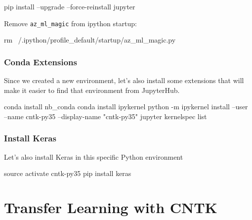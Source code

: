 \documentclass[]{book}
\newenvironment{Shaded}{\begin{snugshade}}{\end{snugshade}}
\newcommand{\StringTok}[1]{\textcolor[rgb]{0.31,0.60,0.02}{#1}}
\newcommand{\FunctionTok}[1]{\textcolor[rgb]{0.00,0.00,0.00}{#1}}
\newcommand{\BuiltInTok}[1]{#1}
\newcommand{\ExtensionTok}[1]{#1}
\newcommand{\NormalTok}[1]{#1}
\theoremstyle{definition}
\theoremstyle{definition}
\theoremstyle{definition}
\theoremstyle{remark}
\begin{document}
\begin{Shaded}
\begin{Highlighting}[]
\ExtensionTok{pip}\NormalTok{ install --upgrade --force-reinstall jupyter}
\end{Highlighting}
\end{Shaded}

Remove \texttt{az\_ml\_magic} from ipython startup:

\begin{Shaded}
\begin{Highlighting}[]
\FunctionTok{rm}\NormalTok{ ~/.ipython/profile_default/startup/az_ml_magic.py}
\end{Highlighting}
\end{Shaded}

\subsection{Conda Extensions}\label{conda-extensions}

Since we created a new environment, let's also install some extensions
that will make it easier to find that environment from JupyterHub.

\begin{Shaded}
\begin{Highlighting}[]
\ExtensionTok{conda}\NormalTok{ install nb_conda}
\ExtensionTok{conda}\NormalTok{ install ipykernel}
\ExtensionTok{python}\NormalTok{ -m ipykernel install --user --name cntk-py35 --display-name }\StringTok{"cntk-py35"}
\ExtensionTok{jupyter}\NormalTok{ kernelspec list}
\end{Highlighting}
\end{Shaded}

\subsection{Install Keras}\label{install-keras}

Let's also install Keras in this specific Python environment

\begin{Shaded}
\begin{Highlighting}[]
\BuiltInTok{source}\NormalTok{ activate cntk-py35}
\ExtensionTok{pip}\NormalTok{ install keras}
\end{Highlighting}
\end{Shaded}

\chapter{Transfer Learning with CNTK}\label{transfer-learning-with-cntk}
\end{document}
